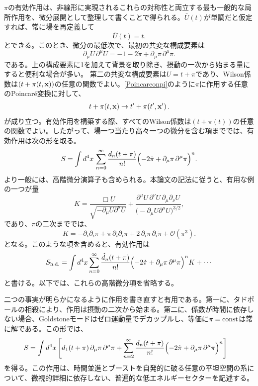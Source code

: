 \documentclass[a4paper,11pt,oneside]{article}
\theoremstyle{definition}
\numberwithin{equation}{section}
\begin{document}
\(\pi\)の有効作用は、非線形に実現されるこれらの対称性と両立する最も一般的な局所作用を、微分展開として整理して書くことで得られる。\(\bar U(t)\)が単調だと仮定すれば、常に場を再定義して
\begin{equation}
\bar U(t)=t .
\end{equation}
とできる。このとき、微分の最低次で、最初の共変な構成要素は
\begin{equation}
\partial_\mu U\,\partial^\mu U 
=
-1-2\dot\pi+\partial_\mu\pi\,\partial^\mu\pi .
\end{equation}
である。上の構成要素に1を加えて背景を取り除き、摂動の一次から始まる量にすると便利な場合が多い。
第二の共変な構成要素は$ U=t+\pi$であり、Wilson係数は$  (t+\pi(t,{\bf x})) $の任意の関数でよい。\eqref{Poincareonpi}のように$  \pi $に作用する任意のPoincar\'e変換に対して、
\begin{align}
t+\pi(t,{\bf x})\to t'+\pi(t',{\bf x}')\,.
\end{align}
が成り立つ。有効作用を構築する際、すべてのWilson係数は$  (t+\pi(t) ) $の任意の関数でよい。したがって、場一つ当たり高々一つの微分を含む項まででは、有効作用は次の形を取る。
\begin{equation}
S
=
\int d^4x\,
\sum_{n=0}^{\infty}
\frac{d_n(t+\pi)}{n!}
\Bigl(-2\dot\pi+\partial_\mu\pi\,\partial^\mu\pi\Bigr)^n .
\end{equation}
より一般には、高階微分演算子も含められる。本論文の記法に従うと、有用な例の一つが量
\begin{equation}
K
=
\frac{\Box U}{\sqrt{-\partial_\mu U\partial^\mu U}}
+
\frac{\partial^\mu U\,\partial^\nu U\,\partial_\mu\partial_\nu U}
{\bigl(-\partial_\mu U\partial^\mu U\bigr)^{3/2}} ,
\end{equation}
であり、\(\pi\)の二次まででは、
\begin{equation}
K
=
-\partial_i\partial_i\pi
+\dot\pi\,\partial_i\partial_i\pi
+2\,\partial_i\pi\,\partial_i\dot\pi
+\mathcal O(\pi^3) .
\end{equation}
となる。このような項を含めると、有効作用は
\begin{equation}
S_{\rm h.d.}=
\int d^4x
\sum_{n=0}^{\infty}
\frac{\hat d_n(t+\pi)}{n!}
\Bigl(-2\dot\pi+\partial_\mu\pi\,\partial^\mu\pi\Bigr)^n K
+\cdots
\end{equation}
と書ける。以下では、これらの高階微分項を省略する。



二つの事実が明らかになるように作用を書き直すと有用である。第一に、タドポールの相殺により、作用は摂動の二次から始まる。第二に、係数が時間に依存しない場合、Goldstoneモードはゼロ運動量でデカップルし、等価に\(\pi={\rm const}\)は常に解である。この形では、
\begin{align}
S=
\int d^4x\,
\Bigg[
&d_1(t+\pi)\,\partial_\mu\pi\,\partial^\mu\pi
+
\sum_{n=2}^{\infty}
\frac{d_n(t+\pi)}{n!}
\Bigl(-2\dot\pi+\partial_\mu\pi\,\partial^\mu\pi\Bigr)^n\Bigg]
\end{align}
を得る。この作用は、時間並進とブーストを自発的に破る任意の平坦空間の系について、微視的詳細に依存しない、普遍的な低エネルギーセクターを記述する。
\end{document}
